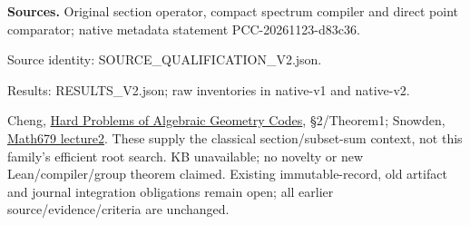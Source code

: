 \documentclass[10pt]{article}
\begin{document}
\textbf{Sources.} Original section operator, compact spectrum compiler and
direct point comparator; native metadata statement PCC-20261123-d83c36.\par
Source identity: SOURCE\_QUALIFICATION\_V2.json.\par
Results: RESULTS\_V2.json; raw inventories in native-v1 and native-v2.\par
Cheng, \href{https://arxiv.org/pdf/cs/0507026}{Hard Problems of Algebraic Geometry Codes},
\S2/Theorem1; Snowden, \href{https://websites.umich.edu/asnowden/teaching/2013/679/L02.html}{Math679 lecture2}.
These supply the classical section/subset-sum context, not this family's
efficient root search. KB unavailable; no novelty or new Lean/compiler/group
theorem claimed. Existing immutable-record, old artifact and journal integration
obligations remain open; all earlier source/evidence/criteria are unchanged.
\end{document}
